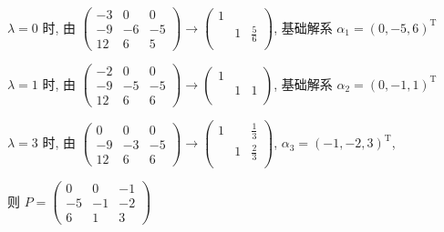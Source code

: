\begin{enumerate}
                   \( \lambda = 0 \) 时, 由 \( \begin{pmatrix}
                       -3 & 0  & 0  \\
                       -9 & -6 & -5 \\
                       12 & 6  & 5
                   \end{pmatrix} \rightarrow \begin{pmatrix}
                       1 &   &             \\
                         & 1 & \frac{5}{6} \\
                         &   &
                   \end{pmatrix} \), 基础解系 \( \alpha_{1} = (0, -5, 6)^{\mathrm{T}} \)

                   \( \lambda = 1 \) 时, 由 \( \begin{pmatrix}
                       -2 & 0  & 0  \\
                       -9 & -5 & -5 \\
                       12 & 6  & 6
                   \end{pmatrix} \rightarrow \begin{pmatrix}
                       1 &   &   \\
                         & 1 & 1 \\
                         &   &
                   \end{pmatrix} \), 基础解系 \( \alpha_{2} = (0, -1, 1)^{\mathrm{T}} \)

                   \( \lambda = 3 \) 时, 由 \( \begin{pmatrix}
                       0  & 0  & 0  \\
                       -9 & -3 & -5 \\
                       12 & 6  & 6
                   \end{pmatrix} \rightarrow \begin{pmatrix}
                       1 &   & \frac{1}{3} \\
                         & 1 & \frac{2}{3} \\
                         &   &
                   \end{pmatrix} \), \( \alpha_{3} = (-1, -2, 3)^{\mathrm{T}} \),

                   则 \( P = \begin{pmatrix}
                       0  & 0  & -1 \\
                       -5 & -1 & -2 \\
                       6  & 1  & 3
                   \end{pmatrix} \)


\end{enumerate}
